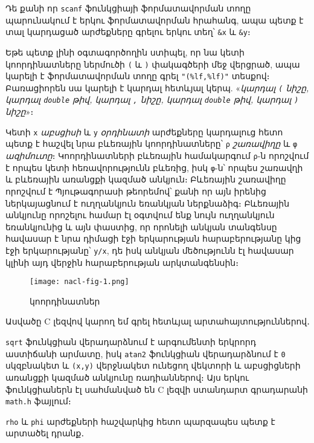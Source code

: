 Դե քանի որ \texttt{scanf} ֆունկցիայի ֆորմատավորման տողը պարունակում է
երկու ֆորմատավորման հրահանգ, ապա պետք է տալ կարդացած արժեքները գրելու
երկու տեղ՝ \texttt{\&x} և \texttt{\&y}։

Եթե պետք լինի օգտագործողին ստիպել, որ նա կետի կոորդինատները ներմուծի
\texttt{(} և \texttt{)} փակագծերի մեջ վերցրած, ապա կարելի է
ֆորմատավորման տողը գրել \texttt{"(\%lf,\%lf)"} տեսքով։ Բառացիորեն սա
կարելի է կարդալ հետևյալ կերպ. «\emph{կարդալ \texttt{(} նիշը, կարդալ
\texttt{double} թիվ, կարդալ \texttt{,} նիշը, կարդալ \texttt{double} թիվ,
կարդալ \texttt{)} նիշը}»։

Կետի \texttt{x} \emph{աբսցիսի} և \texttt{y} \emph{օրդինատի} արժեքները
կարդալուց հետո պետք է հաշվել նրա բևեռային կոորդինատները՝ \texttt{ρ}
\emph{շառավիղը} և \texttt{φ} \emph{ազիմուտը}։ Կոորդինատների բևեռային
համակարգում \texttt{ρ}-ն որոշվում է որպես կետի հեռավորությունն բևեռից,
իսկ \texttt{φ}-ն՝ որպես շառավղի և բևեռային առանցքի կազմած անկյուն։
Բևեռային շառավիղը որոշվում է Պյութագորասի թեորեմով՝ քանի որ այն իրենից
ներկայացնում է ուղղանկյուն եռանկյան ներքնաձիգ։ Բևեռային անկյունը
որոշելու համար էլ օգտվում ենք նույն ուղղանկյուն եռանկյունից և այն
փաստից, որ որոնելի անկյան տանգենսը հավասար է նրա դիմացի էջի երկարության
հարաբերությանը կից էջի երկարությանը՝ \texttt{y/x}, դե իսկ անկյան
մեծությունն էլ հավասար կլինի այդ վերջին հարաբերության արկտանգենսին։

\begin{figure}
\centering
\texttt{[image: nacl-fig-1.png]}
\caption{կոորդինատներ}
\end{figure}

Ասվածը C լեզվով կարող եմ գրել հետևյալ արտահայտություններով․

\begin{Shaded}
\begin{Highlighting}[]
\end{Highlighting}
\end{Shaded}

\texttt{sqrt} ֆունկցիան վերադարձնում է արգումենտի երկրորդ աստիճանի
արմատը, իսկ \texttt{atan2} ֆունկցիան վերադարձնում է \texttt{0} սկզբնակետ
և \texttt{(x,y)} վերջնակետ ունեցող վեկտորի և աբսցիցների առանցքի կազմած
անկյունը ռադիաններով։ Այս երկու ֆունկցիաներն էլ սահմանված են C լեզվի
ստանդարտ գրադարանի \texttt{math.h} ֆայլում։

\texttt{rho} և \texttt{phi} արժեքների հաշվարկից հետո պարզապես պետք է
արտածել դրանք․

